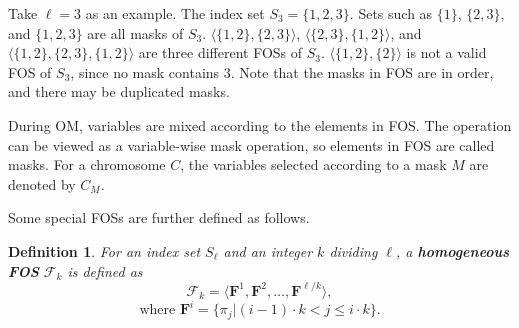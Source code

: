 \documentclass{sig-alternate}
\newtheorem{definition}{Definition}
\begin{document}
Take $\ell = 3$ as an example.
The index set $S_3 = \{1,2,3\}$.
Sets such as $\{1\}$, $\{2,3\}$, and $\{1,2,3\}$ are all masks of $S_3$.
$\langle\{1,2\},\{2,3\}\rangle$, $\langle\{2,3\},\{1,2\}\rangle$, and $\langle\{1,2\},\{2,3\},\{1,2\}\rangle$ are three different FOSs of $S_3$.
$\langle \{1,2\},\{2\}\rangle $ is not a valid FOS of $S_3$, since no mask contains $3$.
Note that the masks in FOS are in order, and there may be duplicated masks.



During OM, variables are mixed
according to the elements in FOS.
The operation can be viewed as a variable-wise mask operation,
so elements in FOS are called masks.
For a chromosome $C$, the variables selected according to a mask $M$ are denoted by $C_M$.

Some special FOSs are further defined as follows.

\begin{definition}
For an index set $S_\ell$ and an integer $k$ dividing $\ell$,
a {\bf{homogeneous FOS}} ${\mathcal F}_k$ is defined as
\begin{equation*}
{\mathcal F}_k = \langle{\mathbf F}^1, {\mathbf F}^2, \dots, {\mathbf F}^{\ell / k}\rangle,
\end{equation*}
\begin{equation*}
\text{where } {\mathbf F}^i = \{\pi_j | \left(i-1\right)\cdot k < j \leq i\cdot k \}.
\end{equation*}
\end{definition}
\end{document}
